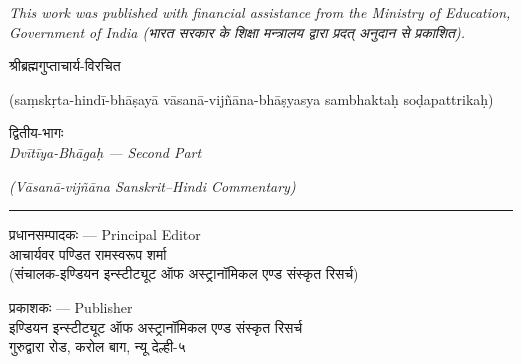 \documentclass[11pt,a4paper]{article}
\newcommand{\longline}{\noindent\rule{\textwidth}{0.4pt}}
\newcommand{\dev}[1]{{\devanagarifont #1}}
\begin{document}
\textit{This work was published with financial assistance from the Ministry of Education, Government of India (भारत सरकार के शिक्षा मन्त्रालय द्वारा प्रदत् अनुदान से प्रकाशित).}

\newpage

\thispagestyle{empty}
\begin{center}
\vspace*{2cm}

{\dev{श्रीब्रह्मगुप्ताचार्य-विरचित}}

\vspace{0.8cm}

{\fontsize{24}{28}\selectfont\dev{ब्राह्मस्फुटसिद्धान्तः}}

\vspace{0.8cm}

{\large (\textsanskrit{saṃskṛta-hindī-bhāṣayā vāsanā-vijñāna-bhāṣyasya sambhaktaḥ soḍapattrikaḥ})}

\vspace{2cm}

{\LARGE\dev{द्वितीय-भागः}}\\[0.5cm]
{\Large\textit{Dvītīya-Bhāgaḥ --- Second Part}}

\vspace{0.5cm}
{\large\textit{(Vāsanā-vijñāna Sanskrit--Hindi Commentary)}}

\vspace{2.5cm}

\longline

\vspace{1cm}

{\normalsize\dev{प्रधानसम्पादकः --- Principal Editor}}\\[0.3cm]
{\large\dev{आचार्यवर पण्डित रामस्वरूप शर्मा}}\\[0.2cm]
{\small (\dev{संचालक-इण्डियन इन्स्टीट्यूट ऑफ अस्ट्रानॉमिकल एण्ड संस्कृत रिसर्च})}

\vspace{1.5cm}

{\normalsize\dev{प्रकाशकः --- Publisher}}\\[0.2cm]
{\dev{इण्डियन इन्स्टीट्यूट ऑफ अस्ट्रानॉमिकल एण्ड संस्कृत रिसर्च}}\\
{\dev{गुरुद्वारा रोड, करोल बाग, न्यू देल्ही-५}}

\end{center}
\newpage
\end{document}

